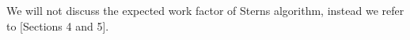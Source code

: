 We will not discuss the expected work factor of Sterns algorithm, instead we refer to \cite{information_set_decoding}[Sections 4 and 5].

%
